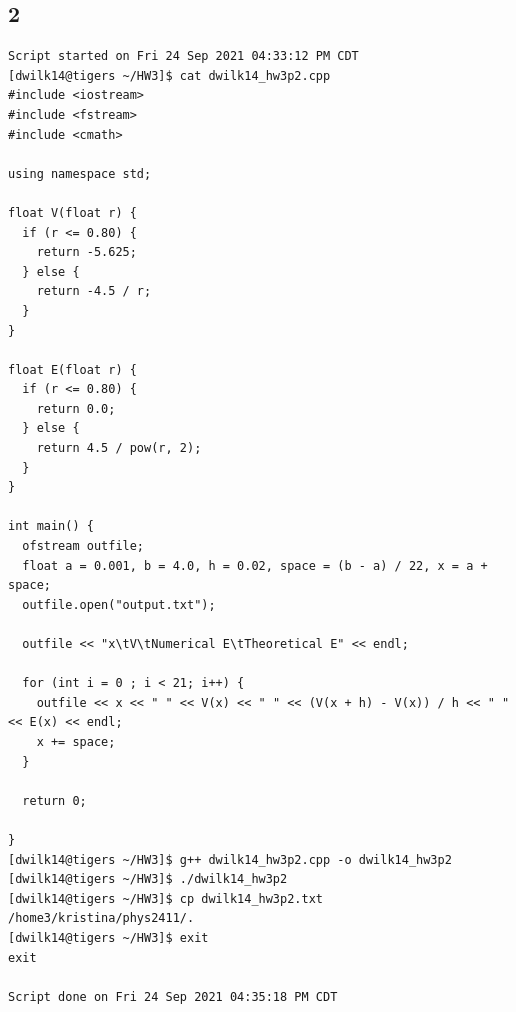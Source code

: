 \documentclass{article}
\begin{document}
\subsection*{2}
\begin{verbatim}
Script started on Fri 24 Sep 2021 04:33:12 PM CDT
[dwilk14@tigers ~/HW3]$ cat dwilk14_hw3p2.cpp
#include <iostream>
#include <fstream>
#include <cmath>

using namespace std;

float V(float r) {
  if (r <= 0.80) {
    return -5.625;
  } else {
    return -4.5 / r;
  }
}

float E(float r) {
  if (r <= 0.80) {
    return 0.0;
  } else {
    return 4.5 / pow(r, 2);
  }
}

int main() {
  ofstream outfile;
  float a = 0.001, b = 4.0, h = 0.02, space = (b - a) / 22, x = a + space;
  outfile.open("output.txt");

  outfile << "x\tV\tNumerical E\tTheoretical E" << endl;

  for (int i = 0 ; i < 21; i++) {
    outfile << x << " " << V(x) << " " << (V(x + h) - V(x)) / h << " " << E(x) << endl;
    x += space;
  }

  return 0;

}
[dwilk14@tigers ~/HW3]$ g++ dwilk14_hw3p2.cpp -o dwilk14_hw3p2
[dwilk14@tigers ~/HW3]$ ./dwilk14_hw3p2
[dwilk14@tigers ~/HW3]$ cp dwilk14_hw3p2.txt /home3/kristina/phys2411/.
[dwilk14@tigers ~/HW3]$ exit
exit

Script done on Fri 24 Sep 2021 04:35:18 PM CDT

\end{verbatim}
\end{document}
